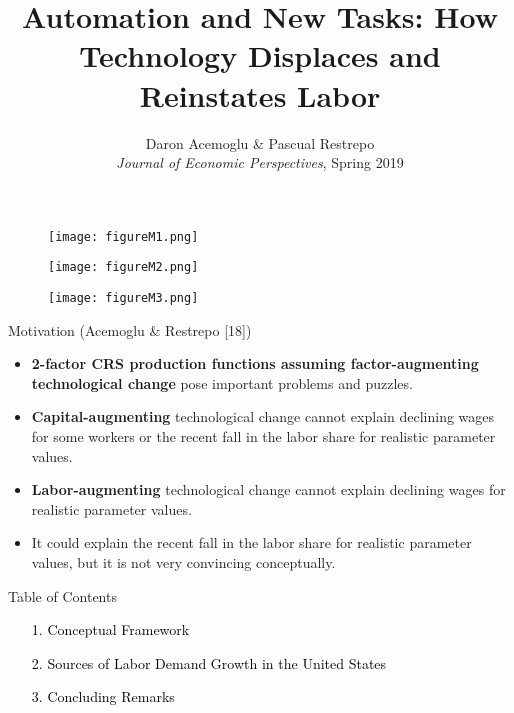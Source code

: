 \documentclass[notes=show]{beamer}
\begin{document}
\title{Automation and New Tasks: How Technology Displaces and Reinstates Labor}
\subtitle{}
\date{Daron Acemoglu \& Pascual Restrepo \bigskip \\
\textit{Journal of Economic Perspectives}, Spring 2019}
\author{}
\maketitle

\newpage
\begin{center}
\begin{figure}
\texttt{[image: figureM1.png]} 
\end{figure}
\end{center}
\newpage

\newpage
\begin{center}
\begin{figure}
\texttt{[image: figureM2.png]}
\end{figure}
\end{center}
\newpage

\newpage
\begin{center}
\begin{figure}
\texttt{[image: figureM3.png]}
\end{figure}
\end{center}
\newpage

\begin{frame}{Motivation (Acemoglu \& Restrepo [18])}
\begin{itemize}
\item \textbf{2-factor CRS production functions assuming factor-augmenting technological change} pose important problems and puzzles. \medskip
\item \textbf{Capital-augmenting} technological change cannot explain declining wages for some workers or the recent fall in the labor share for realistic parameter values. \medskip
\item \textbf{Labor-augmenting} technological change cannot explain declining wages for realistic parameter values. \medskip
\item It could explain the recent fall in the labor share for realistic parameter values, but it is not very convincing conceptually.
\end{itemize}
\end{frame}

\begin{frame}{Table of Contents}
\begin{itemize}
\item[\textcolor{black}{1.}] \textcolor{black}{Conceptual Framework} \bigskip
\item[\textcolor{black}{2.}] \textcolor{black}{Sources of Labor Demand Growth in the United States} \bigskip
\item[\textcolor{black}{3.}] \textcolor{black}{Concluding Remarks}
\end{itemize}
\end{frame}
\end{document}
